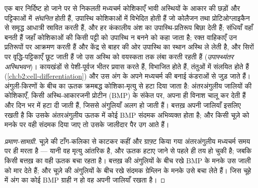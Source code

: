 \begin{proposition}[ढाँचे से अस्थि तक]\label{prop:b2:limb-organogenesis:skeleton}
एक बार निर्दिष्ट हो जाने पर  से निकलती मध्यचर्म कोशिकाएँ
भावी अस्थियों के आकार की छड़ों और पट्टिकाओं में \emph{संघनित} होती हैं,
उपास्थि कोशिकाओं में विभेदित होती हैं जो कोलैजन तथा प्रोटिओग्लाइकैन से
समृद्ध आधात्री स्रावित करती हैं, और हर कंकालीय अंश का उपास्थि-प्रतिरूप
बिछा देती हैं; संधियाँ वहाँ बनती हैं जहाँ कोशिकाओं की किसी पट्टी को
उपास्थि न बनने को कहा जाता है; रक्त वाहिकाएँ उन प्रतिरूपों पर आक्रमण
करती हैं और केंद्र से बाहर की ओर उपास्थि का स्थान अस्थि ले लेती है, और
सिरों पर वृद्धि-पट्टिकाएँ छूट जाती हैं जो उस अस्थि को वयस्कता तक लंबा
करती रहती हैं (\emph{उपास्थ्यंतर अस्थिभवन})। कायखंडों से
पेशी-पूर्वज भीतर प्रवास करते हैं, विभाजित होते हैं, तंतुओं में संलयित
होते हैं (\cref{ch:b2:cell-differentiation}) और उस अंग के अपने मध्यचर्म
की बनाई कंडराओं से जुड़ जाते हैं। अंगुली-किरणों के बीच का ऊतक
क्रमबद्ध कोशिका-मृत्यु से हटा दिया जाता है: अंतरअंगुलीय जालियों की
कोशिकाएँ, किसी अस्थि-आकारजनी प्रोटीन (BMP) के संकेत पर,
अपना ही विनाश चालू कर देती हैं और दिन भर में हटा दी जाती हैं, जिससे
अंगुलियाँ अलग हो जाती हैं। बत्तख़ अपनी जालियाँ इसलिए रखती है कि उसके
अंतरअंगुलीय ऊतक में कोई BMP संदमक अभिव्यक्त होता है; और किसी चूज़े को
मनके पर वही संदमक दिया जाए तो उसके जालीदार पैर उग आते हैं।
\end{proposition}
\begin{proof}[प्रमाण-सामग्री]
चूज़े की टाँग-कलिका से काटकर कहीं और ग्राफ़्ट किया गया अंतरअंगुलीय
मध्यचर्म समय पर ही मरता है --- यानी वह मृत्यु आंतरिक है, और ऊतक हटाए
जाने से पहले ही तय हो चुकी है; जबकि किसी बत्तख़ का वही ऊतक बचा रहता है।
बत्तख़ की अंगुलियों के बीच रखे BMP के मनके उस जाली को मार देते हैं;
और चूज़े की अंगुलियों के बीच रखे संदमक ग्रेम्लिन के मनके उसे बचा लेते
हैं। जिस चूहे में अंग का कोई BMP ग्राही न हो वह अपनी जालियाँ रखता है।
\end{proof}

